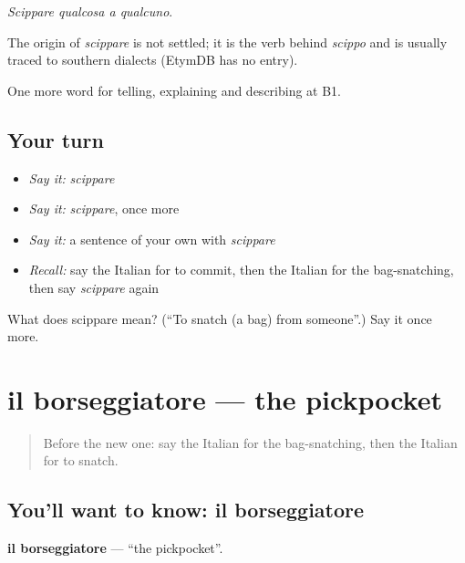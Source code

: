 \emph{Scippare qualcosa a qualcuno}.

\begin{cousinweb}
The origin of \emph{scippare} is not settled; it is the verb behind \emph{scippo} and is usually traced to southern dialects (EtymDB has no entry).
\end{cousinweb}

\begin{grammarlens}[title={What you've built}]
One more word for telling, explaining and describing at B1.
\end{grammarlens}

\subsection*{Your turn}
\begin{itemize}
\raggedright
  \item \emph{Say it:} \emph{scippare}
  \item \emph{Say it:} \emph{scippare}, once more
  \item \emph{Say it:} a sentence of your own with \emph{scippare}
  \item \emph{Recall:} say the Italian for to commit, then the Italian for the bag-snatching, then say \emph{scippare} again
\end{itemize}

\begin{tcolorbox}[breakable,colback=teal!4,colframe=teal!35!black,title={Before you move on}]
What does scippare mean? (\textquotedblleft{}To snatch (a bag) from someone\textquotedblright{}.) Say it once more.
\end{tcolorbox}
\section[il borseggiatore]{il borseggiatore — the pickpocket}

\label{lesson:IT-C291-borseggiatore}



\begin{quote}
Before the new one: say the Italian for the bag-snatching, then the Italian for to snatch.
\end{quote}

\subsection*{You'll want to know: il borseggiatore}
\textbf{il borseggiatore} — \textquotedblleft{}the pickpocket\textquotedblright{}.

